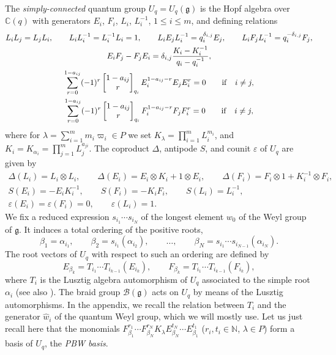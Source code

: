\documentclass[10pt,a4paper]{amsart}
\numberwithin{equation}{section}
\theoremstyle{definition}
\newcommand{\mn}{\mathbb{N}}
\begin{document}
The {\it simply-connected} quantum group $U_q = U_q(\mathfrak{g})$ is the Hopf algebra over $\mathbb {C}(q)$ with generators $E_i$, $F_i$, $L_i$, $L_i^{-1}$, $1\leq i \leq m$, and defining relations
\begin{gather*}%
L_iL_j=L_jL_i , \qquad L_iL_i^{-1}=L_i^{-1}L_i=1,\qquad L_iE_jL_i^{-1}=q_i^{\delta_{i,j}}E_j ,\qquad L_iF_jL_i^{-1}=q_i^{-\delta_{i,j}}F_j, \\
E_iF_j-F_jE_i=\delta_{i,j}\frac{K_i-K_i^{-1}}{q_i-q_i^{-1}},\\
\sum_{r=0}^{1-a_{ij}} (-1)^r \left[\begin{matrix} 1-a_{ij} \\ r \end{matrix}\right]_{q_i} E_i^{1-a_{ij}-r}E_jE_i^{r} = 0 \qquad {\rm if}\quad i\ne j,\\
\sum_{r=0}^{1-a_{ij}} (-1)^r \left[\begin{matrix} 1-a_{ij} \\ r \end{matrix}\right]_{q_i} F_i^{1-a_{ij}-r}F_jF_i^{r} = 0 \qquad {\rm if}\quad i\ne j,
\end{gather*}
where for $ \lambda=\sum_{i=1}^m m_i \varpi_i \in P$ we set $ K_\lambda=\prod_{i=1}^m L_i^{m_i}$, and $ K_i=K_{\alpha_i}=\prod_{j=1}^m L_j^{a_{ji}}$.
The coproduct $\Delta$, antipode $S$, and counit $\varepsilon$ of $U_q$ are given by
\begin{gather*}
\Delta(L_i)=L_i\otimes L_i ,\qquad \Delta(E_i)=E_i\otimes K_i+1\otimes E_i ,\qquad \Delta(F_i)=F_i\otimes 1 + K_i^{-1}\otimes F_i, \\ S(E_i) = -E_iK_i^{-1},\qquad S(F_i) = -K_iF_i ,\qquad S(L_i) = L_i^{- 1},\\ \varepsilon(E_i) = \varepsilon(F_i)=0,\qquad \varepsilon(L_i)=1.
\end{gather*}
We fix a reduced expression $s_{i_1}\cdots s_{i_N}$ of the longest element $w_0$ of the Weyl group of $\mathfrak{g}$. It induces a total ordering of the positive roots,
\[\beta_1 = \alpha_{i_1},\qquad \beta_2 = s_{i_1}(\alpha_{i_2}), \qquad \dots, \qquad\beta_N = s_{i_1}\cdots s_{i_{N-1}}(\alpha_{i_N}).\]
The root vectors of $U_q$ with respect to such an ordering are defined by
\begin{equation}\label{rootvectdef}
E_{\beta_k} = T_{i_1}\cdots T_{i_{k-1}}(E_{i_k}) ,\qquad F_{\beta_k} = T_{i_1}\cdots T_{i_{k-1}}(F_{i_k}),
\end{equation}
where $T_i$ is the Lusztig algebra automorphism of $U_q$ associated to the simple root $\alpha_i$ \mbox{\cite{Lusztig2,Lusztig}} (see also \cite[Chapter~8]{CP}). The braid group $\mathcal{B}(\mathfrak{g})$ acts on $U_q$ by means of the Lusztig automorphisms. In the appendix, we recall the relation between $T_i$ and the generator $\hat{w}_i$ of the quantum Weyl group, which we will mostly use. Let us just recall here that the monomials $F_{\beta_1}^{r_1}\cdots F_{\beta_N}^{r_N}K_\lambda E_{\beta_N}^{t_N}\cdots E_{\beta_1}^{t_1}$ ($r_i,t_i\in \mn$, $\lambda\in P$) form a basis of $U_q$, the {\it PBW basis}.
\end{document}
